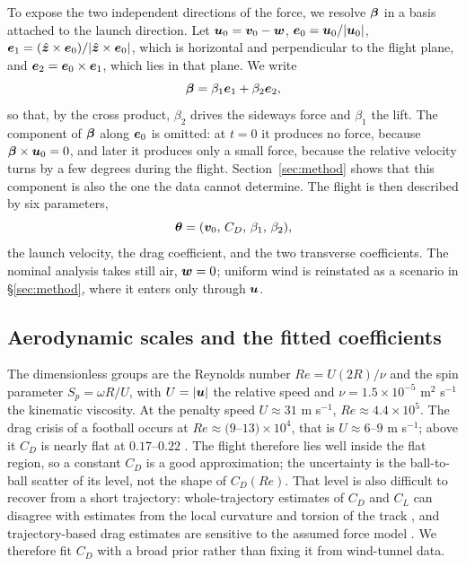 To expose the two independent directions of the force, we resolve $\bm{\beta}$
in a basis attached to the launch direction. Let $\bm{u}_0=\bm{v}_0-\bm{w}$,
$\bm{e}_0=\bm{u}_0/|\bm{u}_0|$,
$\bm{e}_1=(\hat{\bm{z}}\times\bm{e}_0)/|\hat{\bm{z}}\times\bm{e}_0|$,
which is horizontal and perpendicular to the flight plane, and
$\bm{e}_2=\bm{e}_0\times\bm{e}_1$, which lies in that plane. We write
\begin{equation}
  \bm{\beta}=\beta_1\bm{e}_1+\beta_2\bm{e}_2,
  \label{eq:beta}
\end{equation}
so that, by the cross product, $\beta_2$ drives the sideways force and $\beta_1$
the lift. The component of
$\bm{\beta}$ along $\bm{e}_0$ is omitted: at $t=0$ it produces no force, because
$\bm{\beta}\times\bm{u}_0=0$, and later it produces only a small force, because
the relative velocity turns by a few degrees during the flight.
Section~\ref{sec:method} shows that this component is also the one the data
cannot determine. The flight is then described by six parameters,
\begin{equation}
  \bm{\theta}=(\bm{v}_0,\,C_D,\,\beta_1,\,\beta_2),
  \label{eq:theta}
\end{equation}
the launch velocity, the drag coefficient, and the two transverse coefficients.
The nominal analysis takes still air, $\bm{w}=0$; uniform wind is reinstated as
a scenario in \S\ref{sec:method}, where it enters only through $\bm{u}$.

\subsection{Aerodynamic scales and the fitted coefficients}

The dimensionless groups are the Reynolds number $Re=U(2R)/\nu$ and the spin
parameter $S_p=\omega R/U$, with $U=|\bm{u}|$ the relative speed and
$\nu=1.5\times10^{-5}$ m$^2$ s$^{-1}$ the kinematic viscosity. At the penalty
speed $U\approx31$ m s$^{-1}$, $Re\approx4.4\times10^5$. The drag crisis of a
football occurs at $Re\approx(9$--$13)\times10^4$, that is $U\approx6$--$9$
m s$^{-1}$; above it $C_D$ is nearly flat at $0.17$--$0.22$
\citep{carre2005,goff2012}. The flight therefore lies well inside the flat
region, so a constant $C_D$ is a good approximation; the uncertainty is the
ball-to-ball scatter of its level, not the shape of $C_D(Re)$. That level is also
difficult to recover from a short trajectory: whole-trajectory estimates of
$C_D$ and $C_L$ can disagree with estimates from the local curvature and torsion
of the track \citep{jsme2014}, and trajectory-based drag estimates are sensitive
to the assumed force model \citep{florio2019}. We therefore fit $C_D$ with a
broad prior rather than fixing it from wind-tunnel data.

